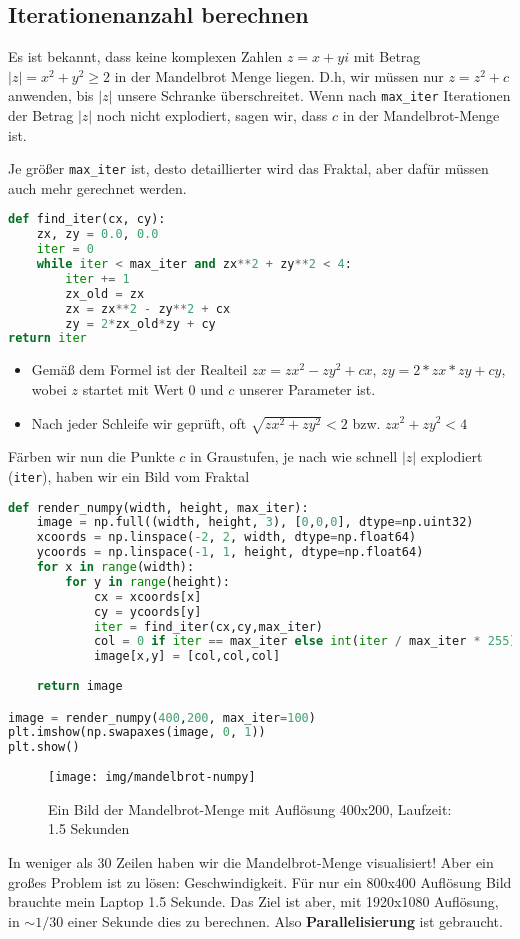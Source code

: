 \documentclass{article}
\begin{document}
\subsection{Iterationenanzahl berechnen}
Es ist bekannt, dass keine komplexen Zahlen $z = x + yi$ mit Betrag $|z| = x^2 + y^2 \geq 2$ in der Mandelbrot Menge liegen. D.h, wir müssen nur $z = z^2 + c$  anwenden, bis $|z|$ unsere Schranke überschreitet. Wenn nach \lstinline|max_iter| Iterationen der Betrag $|z|$ noch nicht explodiert, sagen wir, dass $c$ in der Mandelbrot-Menge ist. 

Je größer \lstinline|max_iter| ist, desto detaillierter wird das Fraktal, aber dafür müssen auch mehr gerechnet werden. 
\begin{lstlisting}[language=Python, caption={Eine Schleife zur Berechnung der Iterationenanzahl}, captionpos=b] 
def find_iter(cx, cy):
	zx, zy = 0.0, 0.0
	iter = 0
	while iter < max_iter and zx**2 + zy**2 < 4:
		iter += 1
		zx_old = zx
		zx = zx**2 - zy**2 + cx
		zy = 2*zx_old*zy + cy
return iter
\end{lstlisting}
\begin{itemize}
\item Gemäß dem Formel ist der Realteil $zx = zx^2 - zy^2 + cx$, $zy = 2*zx*zy + cy$, wobei $z$ startet mit Wert $0$ und $c$ unserer Parameter ist. 
\item Nach jeder Schleife wir geprüft, oft $\sqrt{zx^2 + zy^2} < 2$ bzw. $zx^2 + zy^2 < 4$
\end{itemize}

Färben wir nun die Punkte $c$ in Graustufen, je nach wie schnell $|z|$ explodiert (\lstinline|iter|), haben wir ein Bild vom Fraktal 

\begin{lstlisting}[language=python]
def render_numpy(width, height, max_iter):
    image = np.full((width, height, 3), [0,0,0], dtype=np.uint32)
    xcoords = np.linspace(-2, 2, width, dtype=np.float64)
    ycoords = np.linspace(-1, 1, height, dtype=np.float64)
    for x in range(width):
        for y in range(height):
            cx = xcoords[x]
            cy = ycoords[y]
            iter = find_iter(cx,cy,max_iter)
            col = 0 if iter == max_iter else int(iter / max_iter * 255)
            image[x,y] = [col,col,col]
    
    return image

image = render_numpy(400,200, max_iter=100)
plt.imshow(np.swapaxes(image, 0, 1))
plt.show()
\end{lstlisting}
\begin{figure}[!htb]
	\centering
	\texttt{[image: img/mandelbrot-numpy]}
	\caption{Ein Bild der Mandelbrot-Menge mit Auflösung 400x200, Laufzeit: 1.5  Sekunden}
	\label{fig:mandelbrot-numpy}
\end{figure}
In weniger als 30 Zeilen haben wir die Mandelbrot-Menge visualisiert! Aber ein großes Problem ist zu lösen: Geschwindigkeit. Für nur ein 800x400 Auflösung Bild brauchte mein Laptop 1.5 Sekunde. Das Ziel ist aber, mit 1920x1080 Auflösung, in $\sim 1/30$ einer Sekunde dies zu berechnen. Also \textbf{Parallelisierung} ist gebraucht. 
\end{document}

